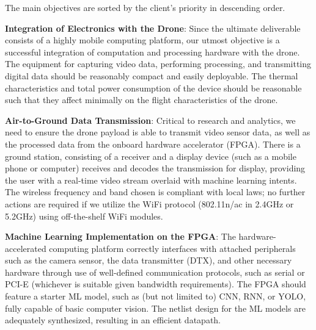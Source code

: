 The main objectives are sorted by the client's priority in descending order.

\textbf{Integration of Electronics with the Drone}:
Since the ultimate deliverable consists of a highly mobile computing platform,
our utmost objective is a successful integration of computation and processing hardware with the drone.
The equipment for capturing video data, performing processing, and transmitting digital data should be reasonably compact and easily deployable.
The thermal characteristics and total power consumption of the device should be reasonable such that they affect minimally
on the flight characteristics of the drone.

\textbf{Air-to-Ground Data Transmission}:
Critical to research and analytics, we need to ensure the drone payload is able to transmit video sensor data, as well as the processed data
from the onboard hardware accelerator (FPGA). There is a ground station, consisting of a receiver and a display device (such as a mobile phone or 
computer) receives and decodes the transmission for display, providing the user with a real-time video stream overlaid with machine learning intents.
The wireless frequency and band chosen is compliant with local laws; no further actions are required if we utilize the WiFi protocol (802.11n/ac in 2.4GHz or 5.2GHz)
using off-the-shelf WiFi modules.

\textbf{Machine Learning Implementation on the FPGA}:
The hardware-accelerated computing platform correctly interfaces with attached peripherals such as the camera sensor, the data transmitter (DTX), and other necessary hardware
through use of well-defined communication protocols, such as serial or PCI-E (whichever is suitable given bandwidth requirements). 
The FPGA should feature a starter ML model, such as (but not limited to) CNN, RNN, or YOLO, fully capable of basic computer vision.
The netlist design for the ML models are adequately synthesized, resulting in an efficient datapath.

